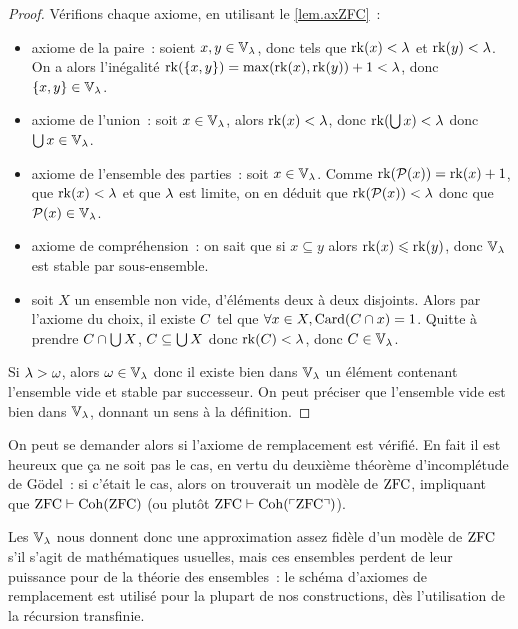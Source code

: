 \begin{proof}
  Vérifions chaque axiome, en utilisant le \cref{lem.axZFC}~:
  \begin{itemize}
  \item axiome de la paire~: soient $x,y\in \mathbb V_\lambda$, donc tels que
    $\operatorname{rk}(x) <\lambda$ et $\operatorname{rk}(y)<\lambda$. On a alors l'inégalité
    $\operatorname{rk}(\{x,y\}) = \max(\operatorname{rk}(x),\operatorname{rk}(y)) + 1 < \lambda$, donc
    $\{x,y\}\in\mathbb V_\lambda$.
  \item axiome de l'union~: soit $x\in \mathbb V_\lambda$, alors $\operatorname{rk}(x) < \lambda$,
    donc $\operatorname{rk}(\bigcup x) < \lambda$ donc $\bigcup x \in \mathbb V_\lambda$.
  \item axiome de l'ensemble des parties~: soit $x\in \mathbb V_\lambda$. Comme
    $\operatorname{rk}(\mathcal{P}(x)) = \operatorname{rk}(x) + 1$, que $\operatorname{rk}(x) < \lambda$ et que $\lambda$
    est limite, on en déduit que $\operatorname{rk}(\mathcal{P}(x)) < \lambda$ donc que
    $\mathcal{P}(x) \in \mathbb V_\lambda$.
  \item axiome de compréhension~: on sait que si $x\subseteq y$ alors
    $\operatorname{rk}(x) \leqslant \operatorname{rk}(y)$, donc $\mathbb V_{\lambda}$ est stable par
    sous-ensemble.
  \item soit $X$ un ensemble non vide, d'éléments deux à deux disjoints. Alors
    par l'axiome du choix, il existe $C$ tel que
    $\forall x \in X,\operatorname{Card}(C\cap x)=1$.
    Quitte à prendre $C \cap \bigcup X$, $C\subseteq \bigcup X$ donc
    $\operatorname{rk}(C) < \lambda$, donc $C\in \mathbb V_\lambda$.
  \end{itemize}

  Si $\lambda > \omega$, alors $\omega \in \mathbb V_\lambda$ donc il existe bien dans
  $\mathbb V_\lambda$ un élément contenant l'ensemble vide et stable par successeur. On
  peut préciser que l'ensemble vide est bien dans $\mathbb V_\lambda$, donnant un sens à
  la définition.
\end{proof}

On peut se demander alors si l'axiome de remplacement est vérifié. En fait il
est heureux que ça ne soit pas le cas, en vertu du deuxième théorème
d'incomplétude de Gödel~: si c'était le cas, alors on trouverait un modèle de
$\operatorname{ZFC}$, impliquant que $\operatorname{ZFC}\vdash \operatorname{Coh}(\operatorname{ZFC})$ (ou plutôt
$\operatorname{ZFC}\vdash \operatorname{Coh}(\ulcorner\operatorname{ZFC}\urcorner)$).

Les $\mathbb V_\lambda$ nous donnent donc une approximation assez fidèle d'un modèle de
$\operatorname{ZFC}$ s'il s'agit de mathématiques usuelles, mais ces ensembles perdent de leur
puissance pour de la théorie des ensembles~: le schéma d'axiomes de remplacement
est utilisé pour la plupart de nos constructions, dès l'utilisation de la
récursion transfinie.

